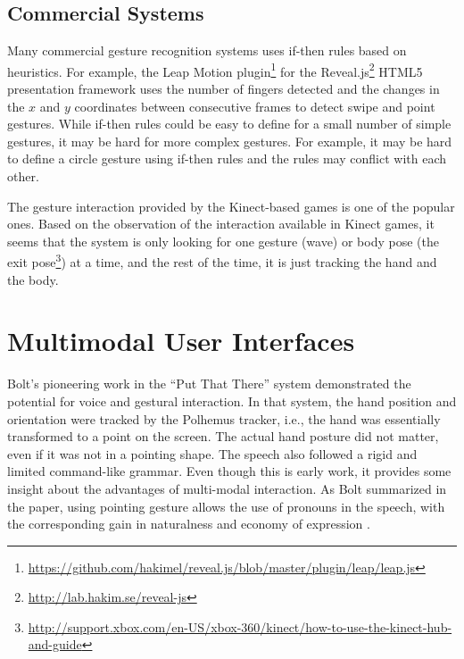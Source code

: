 \subsection{Commercial Systems}
Many commercial gesture recognition systems uses if-then rules based on
heuristics. For example, the Leap Motion
plugin\footnote{\url{https://github.com/hakimel/reveal.js/blob/master/plugin/leap/leap.js}}
for the Reveal.js\footnote{\url{http://lab.hakim.se/reveal-js}} HTML5
presentation framework uses the number of fingers detected and the changes in the $x$ and $y$ coordinates between consecutive
frames to detect swipe and point gestures. While if-then rules could be easy to define for
a small number of simple gestures, it may be hard for more complex gestures.
For example, it may be hard to define a circle gesture using if-then rules and
the rules may conflict with each other.

The gesture interaction provided by the Kinect-based games is
one of the popular ones. Based on the observation of the interaction
available in Kinect games, it seems that the system is only looking for one
gesture (wave) or body pose (the exit
pose\footnote{\url{http://support.xbox.com/en-US/xbox-360/kinect/how-to-use-the-kinect-hub-and-guide}}) at a time, and the rest of the time, 
it is just tracking the hand and the body.

% 

\section{Multimodal User Interfaces}
Bolt's pioneering work in the ``Put That There'' system \cite{Bolt80} 
demonstrated the potential for voice and gestural interaction.  In that system, 
the hand position and orientation were tracked by the Polhemus tracker, i.e.,
the hand was essentially transformed to a point on the screen. The actual hand 
posture did not matter, even if it was not in a pointing shape. The speech also 
followed a rigid and limited command-like grammar. Even though this is early 
work, it provides some insight about the advantages of multi-modal interaction. 
As Bolt summarized in the paper, using pointing gesture allows the use of 
pronouns in the speech, with the corresponding gain in naturalness and economy 
of expression \cite{Bolt80}.

